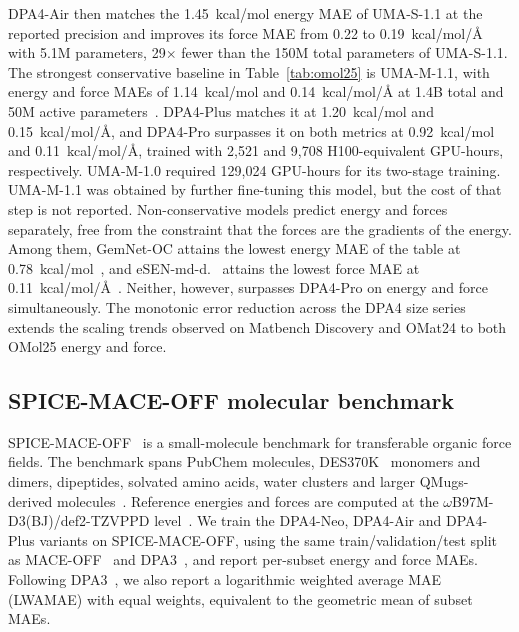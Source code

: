 DPA4-Air then matches the 1.45~kcal/mol energy MAE of UMA-S-1.1 at the reported precision and improves its force MAE from 0.22 to 0.19~kcal/mol/\AA{} with 5.1M parameters, 29$\times$ fewer than the 150M total parameters of UMA-S-1.1.
The strongest conservative baseline in Table~\ref{tab:omol25} is UMA-M-1.1, with energy and force MAEs of 1.14~kcal/mol and 0.14~kcal/mol/\AA{} at 1.4B total and 50M active parameters~\cite{wood2025umafamilyuniversalmodels,levine2025open}.
DPA4-Plus matches it at 1.20~kcal/mol and 0.15~kcal/mol/\AA{}, and DPA4-Pro surpasses it on both metrics at 0.92~kcal/mol and 0.11~kcal/mol/\AA{}, trained with 2,521 and 9,708 H100-equivalent GPU-hours, respectively.
UMA-M-1.0 required 129,024 GPU-hours for its two-stage training.
UMA-M-1.1 was obtained by further fine-tuning this model, but the cost of that step is not reported.
Non-conservative models predict energy and forces separately, free from the constraint that the forces are the gradients of the energy.
Among them, GemNet-OC attains the lowest energy MAE of the table at 0.78~kcal/mol~\cite{gasteiger2022gemnet,levine2025open}, and eSEN-md-d.
\ attains the lowest force MAE at 0.11~kcal/mol/\AA{}~\cite{fu2025esen,levine2025open}.
Neither, however, surpasses DPA4-Pro on energy and force simultaneously.
The monotonic error reduction across the DPA4 size series extends the scaling trends observed on Matbench Discovery and OMat24 to both OMol25 energy and force.

\subsection{SPICE-MACE-OFF molecular benchmark}
\label{sec:small_mol}

SPICE-MACE-OFF~\cite{kovacs2023mace} is a small-molecule benchmark for transferable organic force fields.
The benchmark spans PubChem molecules, DES370K~\cite{donchev2021des370k} monomers and dimers, dipeptides, solvated amino acids, water clusters and larger QMugs-derived molecules~\cite{eastman2023spice,isert2022qmugs}.
Reference energies and forces are computed at the $\omega$B97M-D3(BJ)/def2-TZVPPD level~\cite{eastman2023spice,kovacs2023mace}.
We train the DPA4-Neo, DPA4-Air and DPA4-Plus variants on SPICE-MACE-OFF, using the same train/validation/test split as MACE-OFF~\cite{kovacs2023mace} and DPA3~\cite{zhang2025dpa3}, and report per-subset energy and force MAEs.
Following DPA3~\cite{zhang2025dpa3}, we also report a logarithmic weighted average MAE (LWAMAE) with equal weights, equivalent to the geometric mean of subset MAEs.

